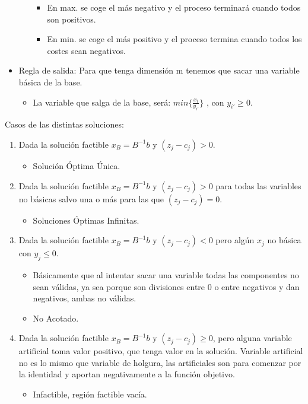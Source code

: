 \documentclass[12pt, twoside, openright]{report} %
\begin{document}
\begin{itemize}
\begin{enumerate}
        \begin{itemize}
      
        \item
          En max. se coge el más negativo y el proceso terminará cuando
          todos son positivos.
        \item
          En min. se coge el más positivo y el proceso termina cuando
          todos los costes sean negativos.
        \end{itemize}
      \end{enumerate}
    \item
      Regla de salida: Para que tenga dimensión m tenemos que sacar una
      variable básica de la base.

      \begin{itemize}
    
      \item
        La variable que salga de la base, será:
        \(min\{ \frac {x_i} {y_{i'}} \}\) , con \(y_{i'} \geq 0\).
      \end{itemize}
    \end{itemize}
\pagebreak
	
  Casos de las distintas soluciones: 
 \begin{enumerate}
	 \item Dada la solución factible
	 \(x_B=B^{-1}b\) y \((z_j-c_j) > 0\). 
	 \begin{itemize}
		 \item Solución Óptima Única. 
	 \end{itemize}
	 \item Dada la solución factible \(x_B=B^{-1}b\) y \((z_j-c_j) > 0\) para todas
	 las variables no básicas salvo una o más para las que
	 \((z_j-c_j) = 0\).
	 \begin{itemize}
		\item Soluciones Óptimas Infinitas. 
	\end{itemize}
	 \item Dada la solución factible \(x_B=B^{-1}b\) y \((z_j-c_j) < 0\) pero algún \(x_j\) no
	 básica con \(y_j \leq 0\).
	 \begin{itemize}
		 \item Básicamente que al intentar sacar una
		 variable todas las componentes no sean válidas, ya sea porque son
		 divisiones entre 0 o entre negativos y dan negativos, ambas no
		 válidas. 
		 \item No Acotado. 
	 \end{itemize}
	 
	 \item Dada la solución factible \(x_B=B^{-1}b\) y
	 \((z_j-c_j) \geq 0\), pero alguna variable artificial toma valor
	 positivo, que tenga valor en la solución. Variable artificial no es
	 lo mismo que variable de holgura, las artificiales son para comenzar
	 por la identidad y aportan negativamente a la función objetivo.
	 \begin{itemize}
		\item Infactible, región factible vacía.
	\end{itemize} 	 
 \end{enumerate} 
\end{document}
